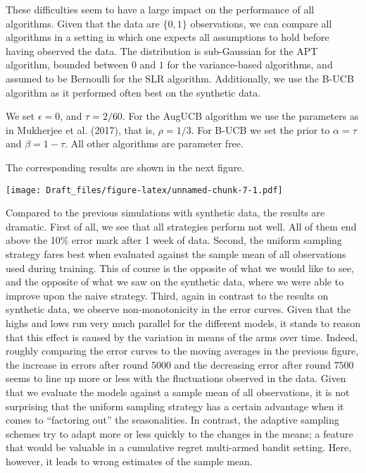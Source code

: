\documentclass[12pt,]{article}
\begin{document}
These difficulties seem to have a large impact on the performance of all
algorithms. Given that the data are \(\{0,1\}\) observations, we can
compare all algorithms in a setting in which one expects all assumptions
to hold before having observed the data. The distribution is
sub-Gaussian for the APT algorithm, bounded between \(0\) and \(1\) for
the variance-based algorithms, and assumed to be Bernoulli for the SLR
algorithm. Additionally, we use the B-UCB algorithm as it performed
often best on the synthetic data.

We set \(\epsilon = 0\), and \(\tau = 2/60\). For the AugUCB algorithm
we use the parameters as in Mukherjee et al. (2017), that is,
\(\rho = 1/3\). For B-UCB we set the prior to \(\alpha = \tau\) and
\(\beta = 1-\tau\). All other algorithms are parameter free.

The corresponding results are shown in the next figure.

\texttt{[image: Draft\_files/figure-latex/unnamed-chunk-7-1.pdf]}

Compared to the previous simulations with synthetic data, the results
are dramatic. First of all, we see that all strategies perform not well.
All of them end above the 10\% error mark after 1 week of data. Second,
the uniform sampling strategy fares best when evaluated against the
sample mean of all observations used during training. This of course is
the opposite of what we would like to see, and the opposite of what we
saw on the synthetic data, where we were able to improve upon the naive
strategy. Third, again in contrast to the results on synthetic data, we
observe non-monotonicity in the error curves. Given that the highs and
lows run very much parallel for the different models, it stands to
reason that this effect is caused by the variation in means of the arms
over time. Indeed, roughly comparing the error curves to the moving
averages in the previous figure, the increase in errors after round
\(5000\) and the decreasing error after round \(7500\) seems to line up
more or less with the fluctuations observed in the data. Given that we
evaluate the models against a sample mean of all observations, it is not
surprising that the uniform sampling strategy has a certain advantage
when it comes to ``factoring out'' the seasonalities. In contrast, the
adaptive sampling schemes try to adapt more or less quickly to the
changes in the means; a feature that would be valuable in a cumulative
regret multi-armed bandit setting. Here, however, it leads to wrong
estimates of the sample mean.
\end{document}
